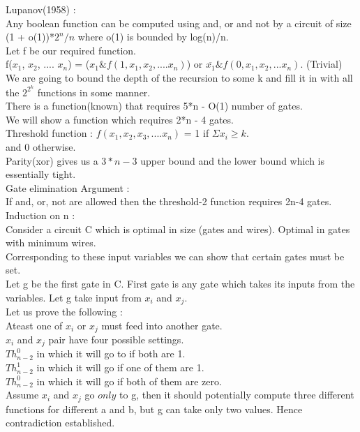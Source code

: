 \documentclass[solution,addpoints,12pt]{exam}
\begin{document}
Lupanov(1958) :\\
Any boolean function can be computed using and, or and not
by a circuit of size (1 + o(1))*$2^n/n$ where
o(1) is bounded by log(n)/n.\\
Let f be our required function.\\
f($x_1$, $x_2$, .... $x_n$) = ($x_1 \& f(1, x_1, x_2, .... x_n)$) or
$\overline{x_1} \& f(0, x_1, x_2, ... x_n)$. (Trivial)\\
We are going to bound the depth of the recursion to some k
and fill it in with all the $2^{2^k}$ functions in some manner.\\
There is a function(known) that requires 5*n - O(1) number of gates.\\
We will show a function which requires 2*n - 4 gates.\\
Threshold function : $f(x_1, x_2, x_3, .... x_n)$ = 1 if $\Sigma x_i \ge k$.\\
and 0 otherwise.\\
Parity(xor) gives us a $3*n-3$ upper bound and the lower bound
which is essentially tight.\\
Gate elimination Argument :\\
If and, or, not are allowed then the threshold-2
function requires 2n-4 gates.\\
Induction on n :\\
Consider a circuit C which is optimal in size (gates and wires).
Optimal in gates with minimum wires.\\
Corresponding to these input variables we can show that certain
gates must be set.\\
Let g be the first gate in C. First gate is any gate which takes
its inputs from the variables. Let g take input from $x_i$ and $x_j$.\\

Let us prove the following :\\
Ateast one of $x_i$ or $x_j$ must feed into another gate.\\
$x_i$ and $x_j$ pair have four possible settings.\\
$Th_{n-2}^{0}$ in which it will go to if both are 1.\\
$Th_{n-2}^{1}$ in which it will go if one of them are 1.\\
$Th_{n-2}^{0}$ in which it will go if both of them are zero.\\

Assume $x_i$ and $x_j$ go $only$ to g, then it should
potentially compute three different functions for different a
and b, but g can take only two values. Hence contradiction established.\\
\end{document}
